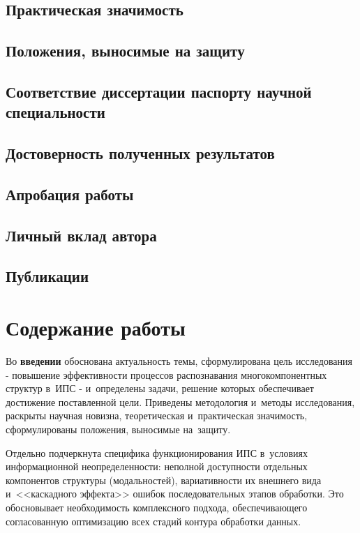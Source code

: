 \subsection*{Практическая значимость}
\influenceText

\subsection*{Положения, выносимые на защиту}

\subsection*{Соответствие диссертации паспорту научной специальности}
\conformityText

\subsection*{Достоверность полученных результатов}
\reliabilityText

\subsection*{Апробация работы}
\probationText

\subsection*{Личный вклад автора}
\contributionText

\subsection*{Публикации}
\publicationsText

\section*{Содержание работы}

Во \textbf{введении} обоснована актуальность темы, сформулирована цель
исследования - повышение эффективности процессов распознавания
многокомпонентных структур в~ИПС - и~определены задачи, решение которых
обеспечивает достижение поставленной цели. Приведены методология и~методы исследования, раскрыты научная
новизна, теоретическая и~практическая значимость, сформулированы положения,
выносимые на~защиту.

Отдельно подчеркнута специфика функционирования ИПС в~условиях
информационной неопределенности: неполной доступности отдельных компонентов
структуры (модальностей), вариативности их внешнего вида и~<<каскадного
эффекта>> ошибок последовательных этапов обработки. Это обосновывает
необходимость комплексного подхода, обеспечивающего согласованную
оптимизацию всех стадий контура обработки данных.

